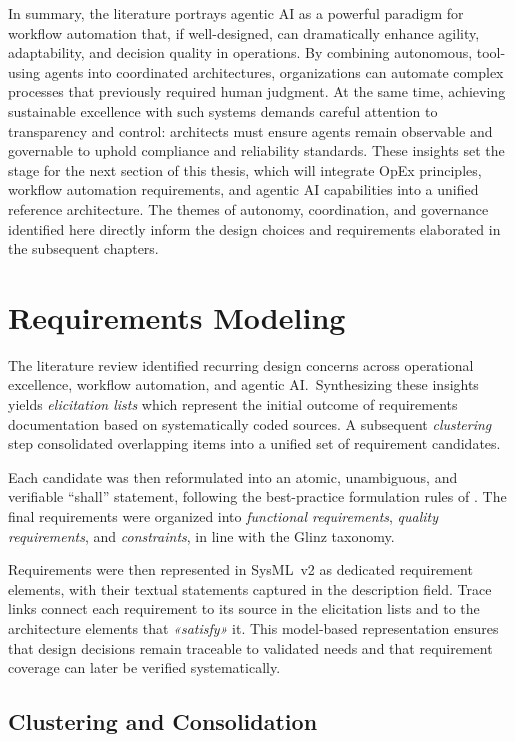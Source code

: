 In summary, the literature portrays agentic AI as a powerful paradigm for workflow automation that, if well-designed, can dramatically enhance agility, adaptability, and decision quality in operations. By combining autonomous, tool-using agents into coordinated architectures, organizations can automate complex processes that previously required human judgment. At the same time, achieving sustainable excellence with such systems demands careful attention to transparency and control: architects must ensure agents remain observable and governable to uphold compliance and reliability standards. These insights set the stage for the next section of this thesis, which will integrate OpEx principles, workflow automation requirements, and agentic AI capabilities into a unified reference architecture. The themes of autonomy, coordination, and governance identified here directly inform the design choices and requirements elaborated in the subsequent chapters.

\section{Requirements Modeling}\label{sec:mod-req}
The literature review identified recurring design concerns across operational excellence, workflow automation, and agentic AI.~Synthesizing these insights yields \emph{elicitation lists} which represent the initial outcome of requirements documentation based on systematically coded sources. A subsequent \emph{clustering} step consolidated overlapping items into a unified set of requirement candidates.

Each candidate was then reformulated into an atomic, unambiguous, and verifiable “shall” statement, following the best-practice formulation rules of \textcite{glinzHandbook2020}. The final requirements were organized into \emph{functional requirements}, \emph{quality requirements}, and \emph{constraints}, in line with the Glinz taxonomy.

Requirements were then represented in SysML~v2 as dedicated requirement elements, with their textual statements captured in the description field. Trace links connect each requirement to its source in the elicitation lists and to the architecture elements that \emph{«satisfy»} it. This model-based representation ensures that design decisions remain traceable to validated needs and that requirement coverage can later be verified systematically. \\

\subsection{Clustering and Consolidation}


